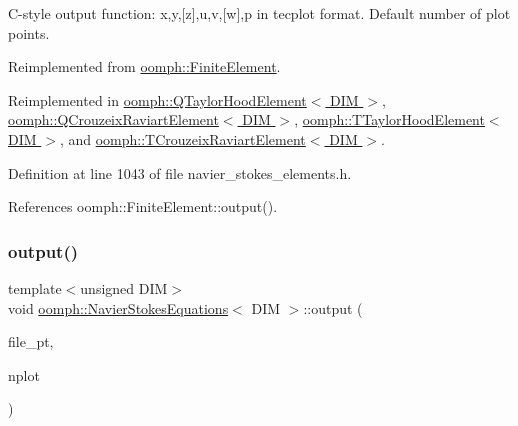 C-\/style output function\+: x,y,\mbox{[}z\mbox{]},u,v,\mbox{[}w\mbox{]},p in tecplot format. Default number of plot points. 



Reimplemented from \hyperlink{classoomph_1_1FiniteElement_a72cddd09f8ddbee1a20a1ff404c6943e}{oomph\+::\+Finite\+Element}.



Reimplemented in \hyperlink{classoomph_1_1QTaylorHoodElement_a75af9559b2b53886f8f256a08c315a45}{oomph\+::\+Q\+Taylor\+Hood\+Element$<$ D\+I\+M $>$}, \hyperlink{classoomph_1_1QCrouzeixRaviartElement_ac6d68815a8cd9885b724d79d133ce00c}{oomph\+::\+Q\+Crouzeix\+Raviart\+Element$<$ D\+I\+M $>$}, \hyperlink{classoomph_1_1TTaylorHoodElement_af3f6c0194dd358936c610fc81e7ff215}{oomph\+::\+T\+Taylor\+Hood\+Element$<$ D\+I\+M $>$}, and \hyperlink{classoomph_1_1TCrouzeixRaviartElement_acfd994f524621438f12661ee012a126a}{oomph\+::\+T\+Crouzeix\+Raviart\+Element$<$ D\+I\+M $>$}.



Definition at line 1043 of file navier\+\_\+stokes\+\_\+elements.\+h.



References oomph\+::\+Finite\+Element\+::output().

\mbox{\label{classoomph_1_1NavierStokesEquations_af09ce1e73bca9a9ac93cb2e34de24f6b}} 
\subsubsection{\texorpdfstring{output()}{output()}\hspace{0.1cm}{\footnotesize\ttfamily [4/4]}}
{\footnotesize\ttfamily template$<$unsigned D\+IM$>$ \\
void \hyperlink{classoomph_1_1NavierStokesEquations}{oomph\+::\+Navier\+Stokes\+Equations}$<$ D\+IM $>$\+::output (\begin{DoxyParamCaption}\item[{F\+I\+LE $\ast$}]{file\+\_\+pt,  }\item[{const unsigned \&}]{nplot }\end{DoxyParamCaption})\hspace{0.3cm}{\ttfamily [virtual]}}



